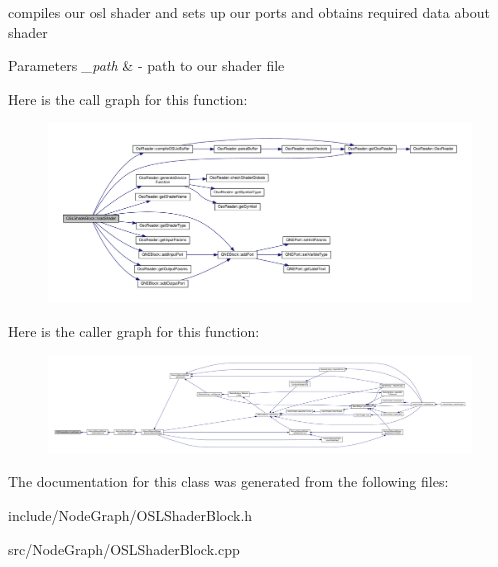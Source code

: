 compiles our osl shader and sets up our ports and obtains required data about shader 


\begin{DoxyParams}{Parameters}
{\em \-\_\-path} & -\/ path to our shader file \\
\hline
\end{DoxyParams}


Here is the call graph for this function\-:
\nopagebreak
\begin{figure}[H]
\begin{center}
\leavevmode
\includegraphics[width=350pt]{class_o_s_l_shader_block_a4c5f75777bcd1a81bd66294f3d736214_cgraph}
\end{center}
\end{figure}




Here is the caller graph for this function\-:
\nopagebreak
\begin{figure}[H]
\begin{center}
\leavevmode
\includegraphics[width=350pt]{class_o_s_l_shader_block_a4c5f75777bcd1a81bd66294f3d736214_icgraph}
\end{center}
\end{figure}




The documentation for this class was generated from the following files\-:\begin{DoxyCompactItemize}
\item 
include/\-Node\-Graph/O\-S\-L\-Shader\-Block.\-h\item 
src/\-Node\-Graph/O\-S\-L\-Shader\-Block.\-cpp\end{DoxyCompactItemize}
